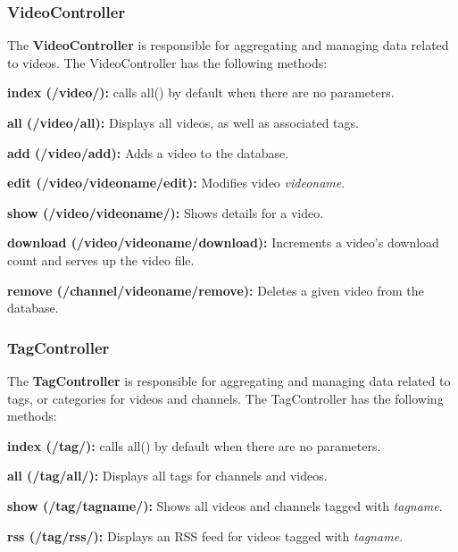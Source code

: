 \documentclass[a4paper,12pt]{report}
\begin{document}
\subsubsection{VideoController}
The \textbf{VideoController} is responsible for aggregating and managing data related to videos. The VideoController has the following methods:
\begin{description}
\item{\textbf{index (/video/): } calls all() by default when there are no parameters.}
\item{\textbf{all (/video/all): } Displays all videos, as well as associated tags.}
\item{\textbf{add (/video/add): } Adds a video to the database.}
\item{\textbf{edit (/video/videoname/edit): } Modifies video \textit{videoname}.}
\item{\textbf{show (/video/videoname/): } Shows details for a video.}
\item{\textbf{download (/video/videoname/download): } Increments a video's download count and serves up the video file.}
\item{\textbf{remove (/channel/videoname/remove): } Deletes a given video from the database.} \\
\end{description} 

\subsubsection{TagController}
The \textbf{TagController} is responsible for aggregating and managing data related to tags, or categories for videos and channels. The TagController has the following methods:
\begin{description}
\item{\textbf{index (/tag/): } calls all() by default when there are no parameters.}
\item{\textbf{all (/tag/all/): } Displays all tags for channels and videos.}
\item{\textbf{show (/tag/tagname/): } Shows all videos and channels tagged with \textit{tagname}.}
\item{\textbf{rss (/tag/rss/): } Displays an RSS feed for videos tagged with \textit{tagname}.} \\
\end{description} 
\end{document}
